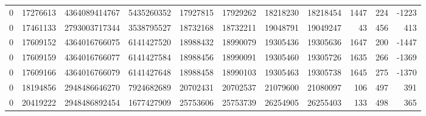 \begin{tabular}{rrrrrrrrrrr}
0 & 17276613 & 4364089414767 & 5435260352 & 17927815 & 17929262 & 18218230 & 18218454 & 1447 & 224 & -1223 \\
0 & 17461133 & 2793003717344 & 3538795527 & 18732168 & 18732211 & 19048791 & 19049247 & 43 & 456 & 413 \\
0 & 17609152 & 4364016766075 & 6141427520 & 18988432 & 18990079 & 19305436 & 19305636 & 1647 & 200 & -1447 \\
0 & 17609159 & 4364016766077 & 6141427584 & 18988456 & 18990091 & 19305460 & 19305726 & 1635 & 266 & -1369 \\
0 & 17609166 & 4364016766079 & 6141427648 & 18988458 & 18990103 & 19305463 & 19305738 & 1645 & 275 & -1370 \\
0 & 18194856 & 2948486646270 & 7924682689 & 20702431 & 20702537 & 21079600 & 21080097 & 106 & 497 & 391 \\
0 & 20419222 & 2948486892454 & 1677427909 & 25753606 & 25753739 & 26254905 & 26255403 & 133 & 498 & 365 \\
\bottomrule
\end{tabular}
